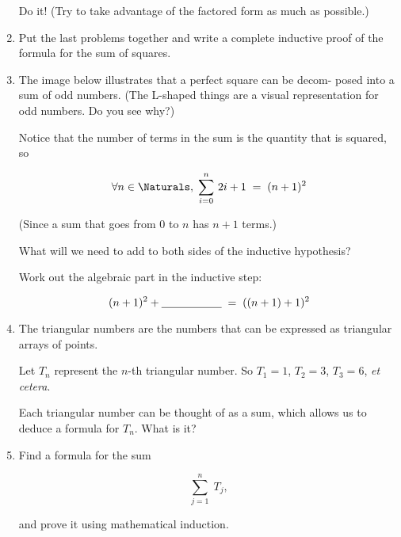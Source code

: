\documentclass{amsart}
\begin{document}
\begin{enumerate}
\noindent Do it! (Try to take advantage of the factored form as much as
possible.)

\vfill

\newpage

\item Put the last problems together and write a complete inductive proof
of the formula for the sum of squares.

\vfill

\newpage

\item The image below illustrates that a perfect square can be decom-
posed into a sum of odd numbers. (The L-shaped things are a
visual representation for odd numbers. Do you see why?)
\bigskip

\centerline{  }
\bigskip

Notice that the number of terms in the sum is the quantity that is
squared, so

\[ \forall n \in \Naturals, \; \sum_{i=0}^n \, 2i+1 \; = \; (n+1)^2 \]

\noindent (Since a sum that goes from $0$ to $n$ has $n + 1$ terms.)

\noindent What will we need to add to both sides of the inductive hypothesis?

\vspace{.75in}

Work out the algebraic part in the inductive step:

\[(n + 1)^2 + \underline{\hspace{.75in}} \; = \; ((n + 1) + 1)^2 \] 

\vfill

\newpage

\item The triangular numbers are the numbers that can be expressed as
triangular arrays of points.
\bigskip

\centerline{  }
\bigskip

Let $T_n$ represent the $n$-th triangular number. So $T_1 = 1$, $T_2 = 3$,
$T_3 = 6$, {\em et cetera}.

Each triangular number can be thought of as a sum, which allows
us to deduce a formula for $T_n$.  What is it?

\vfill

\item Find a formula for the sum

\[ \sum_{j=1}^n \; T_j, \]

\noindent and prove it using mathematical induction.


\end{enumerate}
\end{document}
